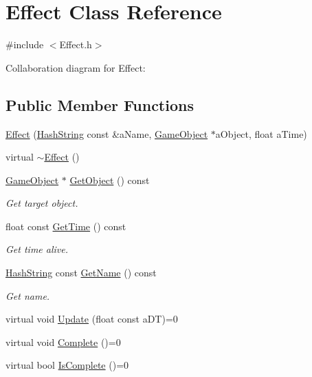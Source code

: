 \hypertarget{classEffect}{}\section{Effect Class Reference}
\label{classEffect}


{\ttfamily \#include $<$Effect.\+h$>$}



Collaboration diagram for Effect\+:
\subsection*{Public Member Functions}
\begin{DoxyCompactItemize}
\item 
\hyperlink{classEffect_aeb0b5eab511175c4157d099c45414ee3}{Effect} (\hyperlink{classHashString}{Hash\+String} const \&a\+Name, \hyperlink{classGameObject}{Game\+Object} $\ast$a\+Object, float a\+Time)
\item 
virtual \hyperlink{classEffect_ac26c0a394247e14c9081f875522b5b66}{$\sim$\+Effect} ()
\item 
\hyperlink{classGameObject}{Game\+Object} $\ast$ \hyperlink{classEffect_aaafd0b2b2646eaeafa8759a84f05d09e}{Get\+Object} () const 
\begin{DoxyCompactList}\small\item\em Get target object. \end{DoxyCompactList}\item 
float const \hyperlink{classEffect_a619980c82823af0948c17eb0f9469d2f}{Get\+Time} () const 
\begin{DoxyCompactList}\small\item\em Get time alive. \end{DoxyCompactList}\item 
\hyperlink{classHashString}{Hash\+String} const \hyperlink{classEffect_a2014218e0e580141475a552a9ec5f81c}{Get\+Name} () const 
\begin{DoxyCompactList}\small\item\em Get name. \end{DoxyCompactList}\item 
virtual void \hyperlink{classEffect_ae146f7a956e013976673c7b1d7c648da}{Update} (float const a\+DT)=0
\item 
virtual void \hyperlink{classEffect_afe1ac2b345c0d969ebb332d9c4c3f9b2}{Complete} ()=0
\item 
virtual bool \hyperlink{classEffect_a02ca4543b018f16c8fe8dad95d183e77}{Is\+Complete} ()=0
\end{DoxyCompactItemize}
